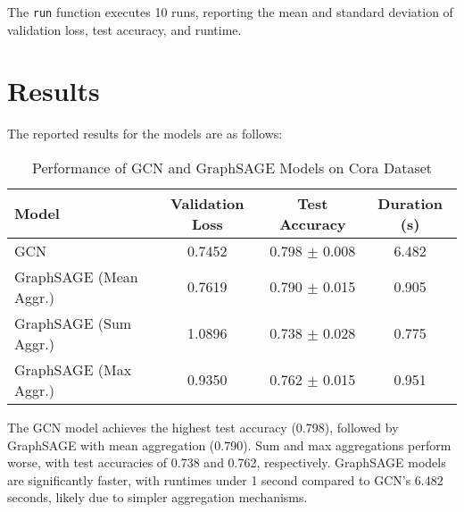 \documentclass{article}
\begin{document}
The \texttt{run} function executes 10 runs, reporting the mean and standard deviation of validation loss, test accuracy, and runtime.

\section*{Results}
The reported results for the models are as follows:\\

\begin{table}[h]
    \centering
    \caption{Performance of GCN and GraphSAGE Models on Cora Dataset}
    \label{tab:results}
    \begin{tabular}{lccc}
        \toprule
        \textbf{Model} & \textbf{Validation Loss} & \textbf{Test Accuracy} & \textbf{Duration (s)} \\
        \midrule
        GCN & 0.7452 & 0.798 $\pm$ 0.008 & 6.482 \\
        GraphSAGE (Mean Aggr.) & 0.7619 & 0.790 $\pm$ 0.015 & 0.905 \\
        GraphSAGE (Sum Aggr.) & 1.0896 & 0.738 $\pm$ 0.028 & 0.775 \\
        GraphSAGE (Max Aggr.) & 0.9350 & 0.762 $\pm$ 0.015 & 0.951 \\
        \bottomrule
    \end{tabular}
\end{table}

The GCN model achieves the highest test accuracy (0.798), followed by GraphSAGE with mean aggregation (0.790). Sum and max aggregations perform worse, with test accuracies of 0.738 and 0.762, respectively. GraphSAGE models are significantly faster, with runtimes under 1 second compared to GCN’s 6.482 seconds, likely due to simpler aggregation mechanisms.
\end{document}
